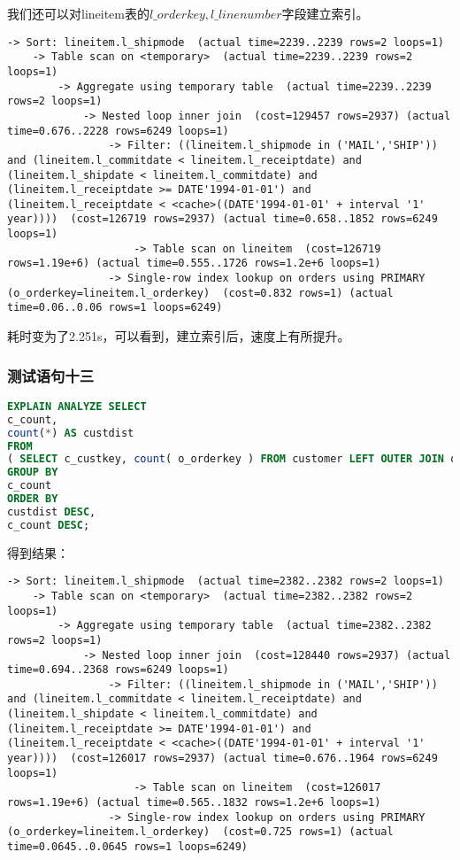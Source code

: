 \documentclass{article}
\begin{document}
我们还可以对lineitem表的$l\_orderkey,l\_linenumber$字段建立索引。

\begin{lstlisting}
-> Sort: lineitem.l_shipmode  (actual time=2239..2239 rows=2 loops=1)
    -> Table scan on <temporary>  (actual time=2239..2239 rows=2 loops=1)
        -> Aggregate using temporary table  (actual time=2239..2239 rows=2 loops=1)
            -> Nested loop inner join  (cost=129457 rows=2937) (actual time=0.676..2228 rows=6249 loops=1)
                -> Filter: ((lineitem.l_shipmode in ('MAIL','SHIP')) and (lineitem.l_commitdate < lineitem.l_receiptdate) and (lineitem.l_shipdate < lineitem.l_commitdate) and (lineitem.l_receiptdate >= DATE'1994-01-01') and (lineitem.l_receiptdate < <cache>((DATE'1994-01-01' + interval '1' year))))  (cost=126719 rows=2937) (actual time=0.658..1852 rows=6249 loops=1)
                    -> Table scan on lineitem  (cost=126719 rows=1.19e+6) (actual time=0.555..1726 rows=1.2e+6 loops=1)
                -> Single-row index lookup on orders using PRIMARY (o_orderkey=lineitem.l_orderkey)  (cost=0.832 rows=1) (actual time=0.06..0.06 rows=1 loops=6249)
\end{lstlisting}

耗时变为了2.251s，可以看到，建立索引后，速度上有所提升。

\subsubsection{测试语句十三}

\begin{lstlisting}[language=sql]
EXPLAIN ANALYZE SELECT
c_count,
count(*) AS custdist 
FROM
( SELECT c_custkey, count( o_orderkey ) FROM customer LEFT OUTER JOIN orders ON c_custkey = o_custkey AND o_comment NOT LIKE '%special%requests%' GROUP BY c_custkey ) AS c_orders ( c_custkey, c_count ) 
GROUP BY
c_count 
ORDER BY
custdist DESC,
c_count DESC;
\end{lstlisting}

得到结果：

\begin{lstlisting}
-> Sort: lineitem.l_shipmode  (actual time=2382..2382 rows=2 loops=1)
    -> Table scan on <temporary>  (actual time=2382..2382 rows=2 loops=1)
        -> Aggregate using temporary table  (actual time=2382..2382 rows=2 loops=1)
            -> Nested loop inner join  (cost=128440 rows=2937) (actual time=0.694..2368 rows=6249 loops=1)
                -> Filter: ((lineitem.l_shipmode in ('MAIL','SHIP')) and (lineitem.l_commitdate < lineitem.l_receiptdate) and (lineitem.l_shipdate < lineitem.l_commitdate) and (lineitem.l_receiptdate >= DATE'1994-01-01') and (lineitem.l_receiptdate < <cache>((DATE'1994-01-01' + interval '1' year))))  (cost=126017 rows=2937) (actual time=0.676..1964 rows=6249 loops=1)
                    -> Table scan on lineitem  (cost=126017 rows=1.19e+6) (actual time=0.565..1832 rows=1.2e+6 loops=1)
                -> Single-row index lookup on orders using PRIMARY (o_orderkey=lineitem.l_orderkey)  (cost=0.725 rows=1) (actual time=0.0645..0.0645 rows=1 loops=6249)
\end{lstlisting}
\end{document}
